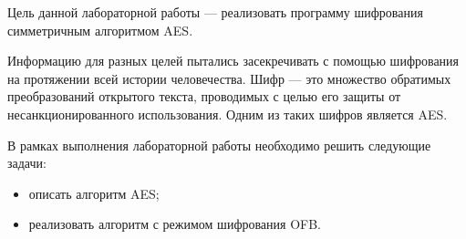 \Introduction

Цель данной лабораторной работы --- реализовать программу шифрования симметричным алгоритмом AES.

Информацию для разных целей пытались засекречивать с помощью шифрования на протяжении всей истории человечества. Шифр --- это множество обратимых преобразований открытого текста, проводимых с целью его защиты от несанкционированного использования. Одним из таких шифров является AES.

В рамках выполнения лабораторной работы необходимо решить следующие задачи: 
\begin{itemize}
	\item описать алгоритм AES;
	\item реализовать алгоритм с режимом шифрования OFB.
\end{itemize}